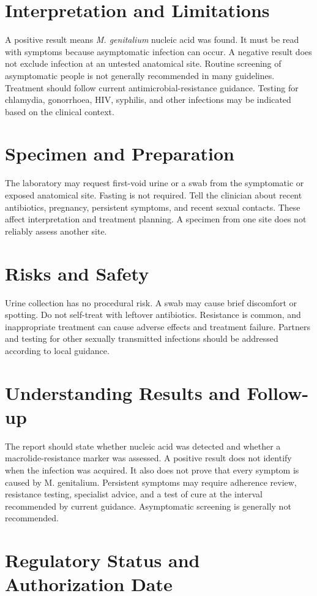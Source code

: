 \section*{Interpretation and Limitations}
A positive result means \textit{M. genitalium} nucleic acid was found. It must be read with symptoms because asymptomatic infection can occur. A negative result does not exclude infection at an untested anatomical site. Routine screening of asymptomatic people is not generally recommended in many guidelines. Treatment should follow current antimicrobial-resistance guidance. Testing for chlamydia, gonorrhoea, HIV, syphilis, and other infections may be indicated based on the clinical context.
\section*{Specimen and Preparation}
The laboratory may request first-void urine or a swab from the symptomatic or exposed anatomical site. Fasting is not required. Tell the clinician about recent antibiotics, pregnancy, persistent symptoms, and recent sexual contacts. These affect interpretation and treatment planning. A specimen from one site does not reliably assess another site.

\section*{Risks and Safety}
Urine collection has no procedural risk. A swab may cause brief discomfort or spotting. Do not self-treat with leftover antibiotics. Resistance is common, and inappropriate treatment can cause adverse effects and treatment failure. Partners and testing for other sexually transmitted infections should be addressed according to local guidance.

\section*{Understanding Results and Follow-up}
The report should state whether nucleic acid was detected and whether a macrolide-resistance marker was assessed. A positive result does not identify when the infection was acquired. It also does not prove that every symptom is caused by M. genitalium. Persistent symptoms may require adherence review, resistance testing, specialist advice, and a test of cure at the interval recommended by current guidance. Asymptomatic screening is generally not recommended.

\section*{Regulatory Status and Authorization Date}

\clearpage
